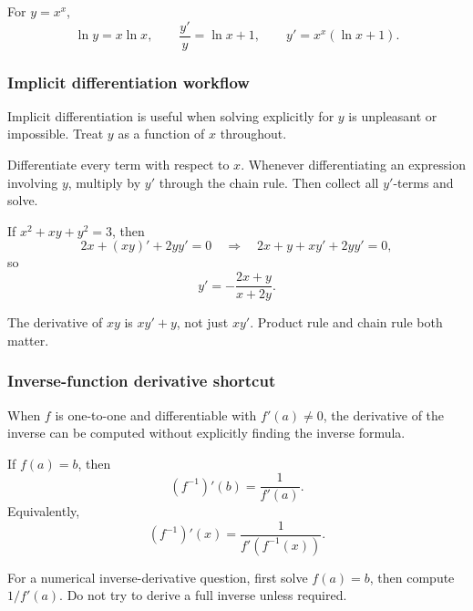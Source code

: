 \begin{examplebox}[title={Variable Power}]
For \(y=x^x\),
\[
\ln y=x\ln x,
\qquad
\frac{y'}{y}=\ln x+1,
\qquad
 y'=x^x(\ln x+1).
\]
\end{examplebox}

\newpage
\subsubsection{Implicit differentiation workflow}
\begin{extension}
Implicit differentiation is useful when solving explicitly for \(y\) is
unpleasant or impossible.  Treat \(y\) as a function of \(x\) throughout.
\end{extension}

\begin{examtip}
Differentiate every term with respect to \(x\).  Whenever differentiating an
expression involving \(y\), multiply by \(y'\) through the chain rule.  Then
collect all \(y'\)-terms and solve.
\end{examtip}

\begin{examplebox}[title={Implicit Derivative}]
If \(x^2+xy+y^2=3\), then
\[
2x+(xy)' +2yy'=0
\quad\Rightarrow\quad
2x+y+xy'+2yy'=0,
\]
so
\[
y'=-\frac{2x+y}{x+2y}.
\]
\end{examplebox}

\begin{commonmistake}
The derivative of \(xy\) is \(x y'+y\), not just \(xy'\).  Product rule and
chain rule both matter.
\end{commonmistake}

\newpage
\subsubsection{Inverse-function derivative shortcut}
\begin{extension}
When \(f\) is one-to-one and differentiable with \(f'(a)\ne0\), the derivative
of the inverse can be computed without explicitly finding the inverse formula.
\end{extension}

\begin{keyformula}[title={Inverse Derivative Formula}]
If \(f(a)=b\), then
\[
(f^{-1})'(b)=\frac{1}{f'(a)}.
\]
Equivalently,
\[
(f^{-1})'(x)=\frac{1}{f'(f^{-1}(x))}.
\]
\end{keyformula}

\begin{examtip}
For a numerical inverse-derivative question, first solve \(f(a)=b\), then
compute \(1/f'(a)\).  Do not try to derive a full inverse unless required.
\end{examtip}

